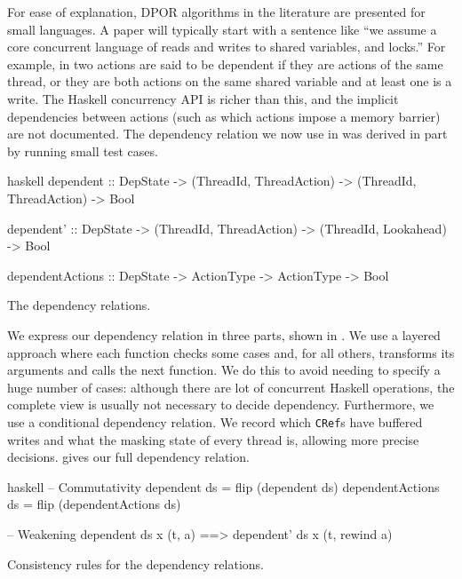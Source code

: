 For ease of explanation, DPOR algorithms in the literature are
presented for small languages.  A paper will typically start with a
sentence like ``we assume a core concurrent language of reads and
writes to shared variables, and locks.''  For example, in
\cite{coons2013} two actions are said to be dependent if they are
actions of the same thread, or they are both actions on the same
shared variable and at least one is a write.  The Haskell concurrency
API is richer than this, and the implicit dependencies between actions
(such as which actions impose a memory barrier) are not documented.
The dependency relation we now use in \dejafu{} was derived in part by
running small test cases.

\begin{listing}
\centering
\begin{cminted}{haskell}
dependent
  :: DepState
  -> (ThreadId, ThreadAction) -> (ThreadId, ThreadAction) -> Bool

dependent'
  :: DepState
  -> (ThreadId, ThreadAction) -> (ThreadId, Lookahead)    -> Bool

dependentActions
  :: DepState
  -> ActionType -> ActionType                             -> Bool
\end{cminted}
\caption{The \dejafu{} dependency relations.}\label{lst:deprel-simp}
\end{listing}

We express our dependency relation in three parts, shown in
.  We use a layered approach where each function
checks some cases and, for all others, transforms its arguments and
calls the next function.  We do this to avoid needing to specify a
huge number of cases: although there are lot of concurrent Haskell
operations, the complete view is usually not necessary to decide
dependency.  Furthermore, we use a conditional dependency
relation\cite{godefroid1993}.  We record which \verb|CRef|s have
buffered writes and what the masking state of every thread is,
allowing more precise decisions.   gives our full
dependency relation.

\begin{listing}
\centering
\begin{cminted}{haskell}
-- Commutativity
dependent        ds = flip (dependent        ds)
dependentActions ds = flip (dependentActions ds)

-- Weakening
dependent ds x (t, a) ==> dependent' ds x (t, rewind a)
\end{cminted}
\caption{Consistency rules for the dependency relations.}\label{lst:deprel-consistency}
\end{listing}


